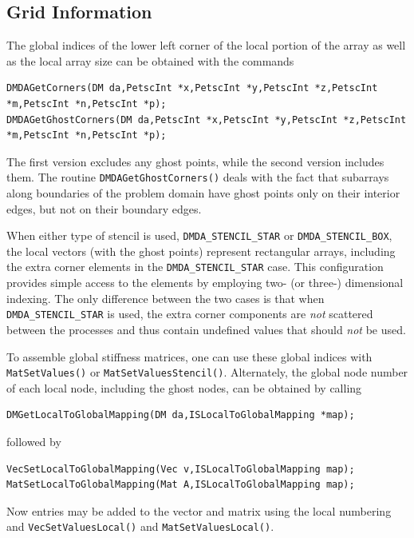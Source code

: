 \subsection{Grid Information}

The global indices of the lower left corner of the local portion of the array
as well as the local array size can be obtained with the commands
\begin{lstlisting}
DMDAGetCorners(DM da,PetscInt *x,PetscInt *y,PetscInt *z,PetscInt *m,PetscInt *n,PetscInt *p);
DMDAGetGhostCorners(DM da,PetscInt *x,PetscInt *y,PetscInt *z,PetscInt *m,PetscInt *n,PetscInt *p);
\end{lstlisting}
The first version excludes any ghost points, while the second version
includes them.
The routine \lstinline{DMDAGetGhostCorners()}
deals with the fact that subarrays along boundaries of the problem
domain have ghost points only on their interior edges, but not on
their boundary edges.

When either type of stencil is used, \lstinline{DMDA_STENCIL_STAR} or
\lstinline{DMDA_STENCIL_BOX}, the local vectors (with the ghost points)
represent rectangular arrays, including the extra corner elements in
the \lstinline{DMDA_STENCIL_STAR} case. This configuration provides simple
access to the elements by employing two- (or three-) dimensional indexing.
The only difference between the
two cases is that when \lstinline{DMDA_STENCIL_STAR} is used, the extra
corner components are {\em not} scattered between the processes and thus
contain undefined values that should {\em not} be used.

To assemble global stiffness matrices, one can use these global indices with \lstinline{MatSetValues()}
or \lstinline{MatSetValuesStencil()}.
Alternately, the global node number of each local node,
including the ghost nodes, can be obtained by calling
\begin{lstlisting}
DMGetLocalToGlobalMapping(DM da,ISLocalToGlobalMapping *map);
\end{lstlisting}
followed by
\begin{lstlisting}
VecSetLocalToGlobalMapping(Vec v,ISLocalToGlobalMapping map);
MatSetLocalToGlobalMapping(Mat A,ISLocalToGlobalMapping map);
\end{lstlisting}
Now entries may be added to the vector and matrix using the local numbering
and \break\lstinline{VecSetValuesLocal()} and \lstinline{MatSetValuesLocal()}.


